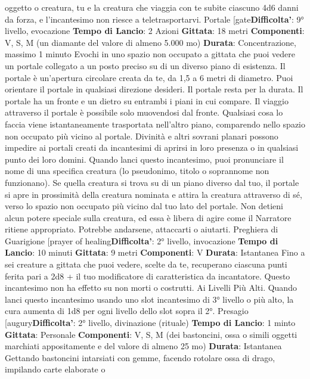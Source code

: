 \begin{multicols}{2}
oggetto o creatura, tu e la creatura che viaggia con te
subite ciascuno 4d6 danni da forza, e l’incantesimo non
riesce a teletrasportarvi.
Portale
[gate\textbf{Difficolta'}:
9° livello, evocazione
\textbf{Tempo di Lancio}: 2 Azioni
\textbf{Gittata}: 18 metri
\textbf{Componenti}: V, S, M (un diamante del valore di
almeno 5.000 mo)
\textbf{Durata}: Concentrazione, massimo 1 minuto
Evochi in uno spazio non occupato a gittata che puoi
vedere un portale collegato a un posto preciso su di un
diverso piano di esistenza. Il portale è un’apertura
circolare creata da te, da 1,5 a 6 metri di diametro. Puoi
orientare il portale in qualsiasi direzione desideri. Il
portale resta per la durata.
Il portale ha un fronte e un dietro su entrambi i piani in
cui compare. Il viaggio attraverso il portale è possibile
solo muovendosi dal fronte. Qualsiasi cosa lo faccia
viene istantaneamente trasportata nell’altro piano,
comparendo nello spazio non occupato più vicino al
portale.
Divinità e altri sovrani planari possono impedire ai
portali creati da incantesimi di aprirsi in loro presenza o
in qualsiasi punto dei loro domini.
Quando lanci questo incantesimo, puoi pronunciare il
nome di una specifica creatura (lo pseudonimo, titolo o
soprannome non funzionano). Se quella creatura si
trova su di un piano diverso dal tuo, il portale si apre in
prossimità della creatura nominata e attira la creatura
attraverso di sé, verso lo spazio non occupato più vicino
dal tuo lato del portale. Non detieni alcun potere
speciale sulla creatura, ed essa è libera di agire come il
Narratore ritiene appropriato. Potrebbe andarsene, attaccarti
o aiutarti.
Preghiera di Guarigione
[prayer of healing\textbf{Difficolta'}:
2° livello, invocazione
\textbf{Tempo di Lancio}: 10 minuti
\textbf{Gittata}: 9 metri
\textbf{Componenti}: V
\textbf{Durata}: Istantanea
Fino a sei creature a gittata che puoi vedere, scelte da
te, recuperano ciascuna punti ferita pari a 2d8 + il tuo
modificatore di caratteristica da incantatore. Questo
incantesimo non ha effetto su non morti o costrutti.
Ai Livelli Più Alti. Quando lanci questo incantesimo
usando uno slot incantesimo di 3° livello o più alto, la
cura aumenta di 1d8 per ogni livello dello slot sopra il
2°.
Presagio
[augury\textbf{Difficolta'}:
2° livello, divinazione (rituale)
\textbf{Tempo di Lancio}: 1 minto
\textbf{Gittata}: Personale
\textbf{Componenti}: V, S, M (dei bastoncini, ossa o simili
oggetti marchiati appositamente e del valore di almeno
25 mo)
\textbf{Durata}: Istantanea
Gettando bastoncini intarsiati con gemme, facendo
rotolare ossa di drago, impilando carte elaborate o

\end{multicols}
